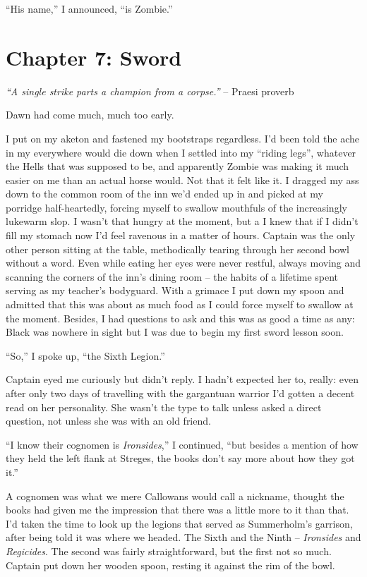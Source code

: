 \documentclass[12pt, openany]{book}
\begin{document}
“His name,” I announced, “is Zombie.”
\clearpage
\chapter{Chapter 7: Sword}

\textit{“A single strike parts a champion from a corpse.”}
– Praesi proverb

Dawn had come much, much too early.

I put on my aketon and fastened my bootstraps regardless. I’d been told the ache in my everywhere would die down when I settled into my “riding legs”, whatever the Hells that was supposed to be, and apparently Zombie was making it much easier on me than an actual horse would. Not that it felt like it. I dragged my ass down to the common room of the inn we’d ended up in and picked at my porridge half-heartedly, forcing myself to swallow mouthfuls of the increasingly lukewarm slop. I wasn’t that hungry at the moment, but a I knew that if I didn’t fill my stomach now I’d feel ravenous in a matter of hours. Captain was the only other person sitting at the table, methodically tearing through her second bowl without a word. Even while eating her eyes were never restful, always moving and scanning the corners of the inn’s dining room – the habits of a lifetime spent serving as my teacher’s bodyguard. With a grimace I put down my spoon and admitted that this was about as much food as I could force myself to swallow at the moment. Besides, I had questions to ask and this was as good a time as any: Black was nowhere in sight but I was due to begin my first sword lesson soon.

“So,” I spoke up, “the Sixth Legion.”

Captain eyed me curiously but didn’t reply. I hadn’t expected her to, really: even after only two days of travelling with the gargantuan warrior I’d gotten a decent read on her personality. She wasn’t the type to talk unless asked a direct question, not unless she was with an old friend.

“I know their cognomen is \textit{Ironsides},” I continued, “but besides a mention of how they held the left flank at Streges, the books don’t say more about how they got it.”

A cognomen was what we mere Callowans would call a nickname, thought the books had given me the impression that there was a little more to it than that. I’d taken the time to look up the legions that served as Summerholm’s garrison, after being told it was where we headed. The Sixth and the Ninth – \textit{Ironsides} and \textit{Regicides}. The second was fairly straightforward, but the first not so much. Captain put down her wooden spoon, resting it against the rim of the bowl.
\end{document}
